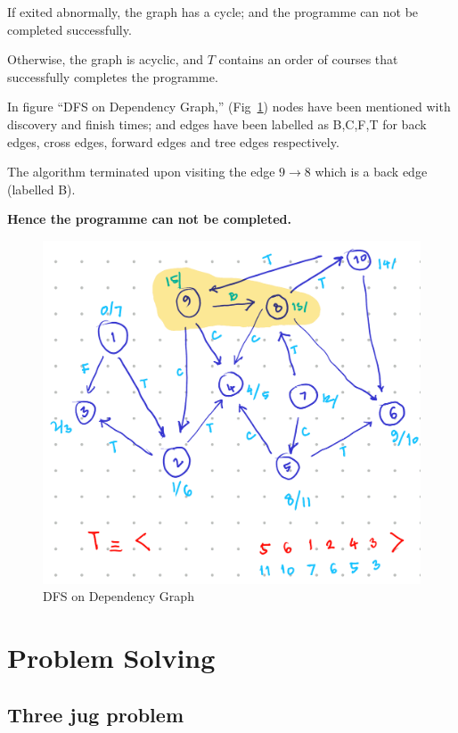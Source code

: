 \documentclass[11pt]{article}
\begin{document}
If exited abnormally, the graph has a cycle; and the
programme can not be completed successfully.

Otherwise, the graph is acyclic, and \(T\) contains an
order of courses that successfully completes the
programme.

In figure “DFS on Dependency Graph,”
(Fig~\ref{fig:dfsOnDependencyGraph}) nodes
have been mentioned with discovery and finish times;
and edges have been labelled as B,C,F,T for back edges,
cross edges, forward edges and tree edges respectively.

The algorithm terminated upon visiting the edge \(9\to
8\) which is a back edge (labelled B).

\textbf{Hence the programme can not be completed.}
\begin{figure}[htbp]
\centering
\includegraphics[width=.9\linewidth]{images/dfsOnDependencyGraph.png}
\caption{\label{fig:dfsOnDependencyGraph}DFS on Dependency Graph}
\end{figure}



\section{Problem Solving}
\label{sec:orgd7116bd}

\subsection{Three jug problem}
\label{sec:org168740a}
\end{document}
